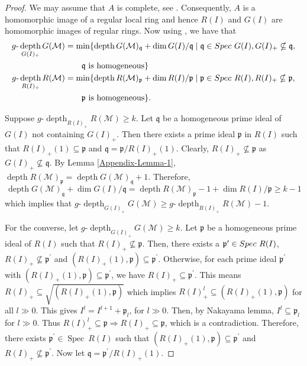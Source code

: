 \documentclass[11pt,reqno]{amsart}
\theoremstyle{definition}
\newcommand{\p}{\mathfrak p}
\newcommand{\q}{\mathfrak q}
\DeclareMathOperator{\Spec}{Spec}
\def\M{{\mathcal M}}
\DeclareMathOperator{\depth}{depth}
\numberwithin{equation}{section}
\begin{document}
	\begin{proof}
		We may assume that $A$ is complete, see \cite[Remark 2.4]{HM94}. Consequently, $A$ is a homomorphic image of a regular local ring and hence
		$R(I)$ and $G(I)$ are homomorphic images of regular rings. 
		Now using \cite[Proposition 2.4]{marley2}, we have that	
		\begin{align*}
			g\text{-} \depth_{G(I)_+} G(\mathcal{M})&=
			\min\{\depth G(\mathcal{M})_\q+\dim G(I)/\q \mid \q\in \rm{Spec}~ G(I), G(I)_+\nsubseteq \q,  \\& \qquad \q\text{ is homogeneous}\}\\
			g\text{-} \depth_{R(I)_+} R(\M)&=\min\{\depth R(\M)_\p+\dim R(I)/\p  \mid \p\in \rm{Spec}~ R(I), R(I)_+\nsubseteq \p,
		  \\&\qquad \p \text{ is homogeneous}\}. 
		\end{align*}
		
		Suppose $g\text{-} \depth_{R(I)_+}R(\M)\geq k$.
       Let $\q$ be a homogeneous prime ideal of $G(I)$ not containing $G(I)_+$. 
       Then there exists a prime ideal 
		 $\p$ in $R(I)$ such that $R(I)_+(1)\subseteq \p$ and $\q=\p/R(I)_+(1)$. Clearly, $R(I)_+\nsubseteq \p$ as $G(I)_+\nsubseteq \q$. 
		By Lemma  \ref{Appendix-Lemma-1}, $\depth R(\M)_\p=\depth G(\M)_\q+1$. Therefore,
		\begin{equation*}\depth G(\mathcal{M})_\q+\dim G(I)/\q =\depth R(\M)_\p-1+\dim R(I)/\p\geq k-1\end{equation*}
		which implies that $g\text{-} \depth_{G(I)_+} G(\mathcal{M})\geq g\text{-} \depth_{R(I)_+}R(\M) -1.$
		
		For the converse, let $g\text{-} \depth_{G(I)_+} G(\mathcal{M})\geq k$. Let $\p$ be a homogeneous prime ideal of $R(I)$ such that $R(I)_+\nsubseteq \p$. 
		Then, there exists a ${\p}^{\prime}\in \rm{Spec} ~R(I)$, $R(I)_+\nsubseteq \p^\prime$ and $(R(I)_+(1),\p)\subseteq \p^\prime.$ Otherwise, for each prime ideal $\p^\prime$ with 
		$(R(I)_+(1),\p)\subseteq \p^\prime$, we have $R(I)_+\subseteq \p^\prime$. This means $R(I)_+\subseteq \sqrt{(R(I)_+(1),\p)}$ which implies $R(I)_{+}^l\subseteq (R(I)_+(1),\p)$ for all $l\gg 0$. This gives $I^l=I^{l+1}+\p_l$, for $l\gg 0$. Then, by Nakayama lemma, $I^l\subseteq\p_l$ for $l\gg 0$. Thus $R(I)_+^l\subseteq \p\Rightarrow  R(I)_+\subseteq \p$, which is a contradiction. Therefore,  there exists $\p^\prime \in \Spec~ R(I)$ such that $(R(I)_+(1),\p)\subseteq\p^\prime$ and $R(I)_+\nsubseteq \p^\prime$. Now let $\q=\p^\prime/R(I)_+(1).$




\end{proof}
\end{document}
